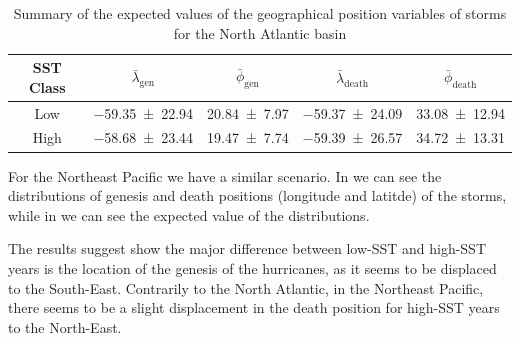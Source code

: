\begin{table}[H]
	\centering
	\begin{tabular}{c cc cc}
		\toprule
		\toprule
		SST Class & $\bar{\lambda}_{\text{gen}}$   & $\bar{\phi}_{\text{gen}}$
		          & $\bar{\lambda}_{\text{death}}$ & $\bar{\phi}_{\text{death}}$ \\
		\midrule
		Low       & \num{-59.35 \pm 22.94} & \num{20.84 \pm 7.97} & \num{-59.37 \pm 24.09} & \num{33.08 \pm 12.94} \\
		High      & \num{-58.68 \pm 23.44} & \num{19.47 \pm 7.74} & \num{-59.39 \pm 26.57} & \num{34.72 \pm 13.31} \\
		\bottomrule
	\end{tabular}
	\caption{Summary of the expected values of the geographical position variables of storms for the North Atlantic basin}
	\label{tab:natl-positions}
\end{table}

For the Northeast Pacific we have a similar scenario. In  we can see the distributions of genesis and death positions (longitude and latitde) of the storms, while in  we can see the expected value of the distributions.

The results suggest show the major difference between low-SST and high-SST years is the location of the genesis of the hurricanes, as it seems to be displaced to the South-East. Contrarily to the North Atlantic, in the Northeast Pacific, there seems to be a slight displacement in the death position for high-SST years to the North-East.

